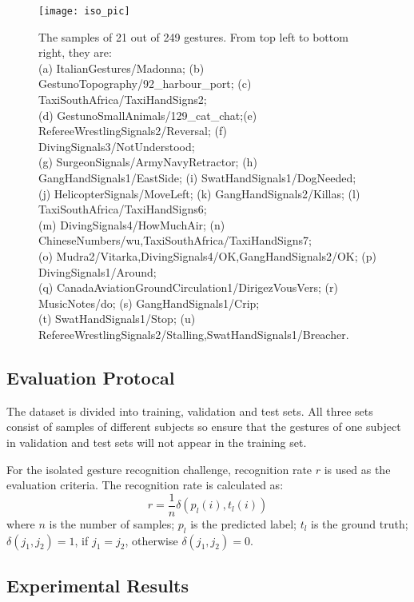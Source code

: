 \documentclass[10pt, a4paper, conference]{IEEEtran}
\begin{document}
\begin{figure*}[t]
\begin{center}{\texttt{[image: iso\_pic]}}
\end{center}
\caption{The samples of 21 out of 249 gestures. From top left to bottom right, they are: \\(a) ItalianGestures/Madonna; (b) GestunoTopography/92\_harbour\_port; (c) TaxiSouthAfrica/TaxiHandSigns2;\\ (d) GestunoSmallAnimals/129\_cat\_chat;(e) RefereeWrestlingSignals2/Reversal; (f) DivingSignals3/NotUnderstood;\\(g) SurgeonSignals/ArmyNavyRetractor; (h) GangHandSignals1/EastSide; (i) SwatHandSignals1/DogNeeded;\\(j) HelicopterSignals/MoveLeft; (k) GangHandSignals2/Killas; (l) TaxiSouthAfrica/TaxiHandSigns6;\\ (m) DivingSignals4/HowMuchAir; (n) ChineseNumbers/wu,TaxiSouthAfrica/TaxiHandSigns7;\\ (o) Mudra2/Vitarka,DivingSignals4/OK,GangHandSignals2/OK; (p) DivingSignals1/Around;\\(q) CanadaAviationGroundCirculation1/DirigezVousVers; (r) MusicNotes/do; (s) GangHandSignals1/Crip;\\ (t) SwatHandSignals1/Stop; (u) RefereeWrestlingSignals2/Stalling,SwatHandSignals1/Breacher.}
\label{fig:samples}
\end{figure*}


\subsection{Evaluation Protocal}

The dataset is divided into training, validation and test sets. All three sets consist of samples of different subjects so ensure that the gestures of one subject in validation and test sets will not appear in the training set.

For the isolated gesture recognition challenge, recognition rate $r$ is used as the evaluation criteria. The recognition rate is calculated as:
\begin{equation}
r = \dfrac{1}{n}\delta(p_{l}(i),t_{l}(i))
\end{equation}
where $n$ is the number of samples; $p_{l}$ is the predicted label; $t_{l}$ is the ground truth; $\delta(j_{1},j_{2}) = 1$, if $j_{1} = j_{2}$, otherwise $\delta(j_{1},j_{2}) = 0$.


\subsection{Experimental Results}
\end{document}
